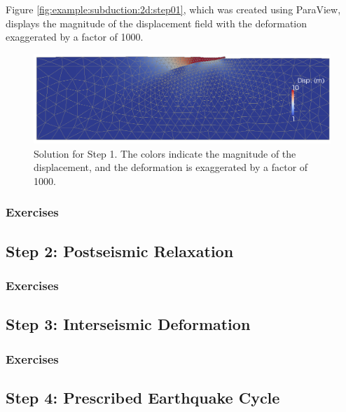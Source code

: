 Figure \vref{fig:example:subduction:2d:step01}, which was created using
ParaView, displays the magnitude of the displacement field with the
deformation exaggerated by a factor of 1000. 

\begin{figure}
  \includegraphics[width=4.5in]{examples/figs/subduction2d_step01_soln}
  \caption{Solution for Step 1. The colors indicate the magnitude of the displacement,
    and the deformation is exaggerated by a factor of 1000. }
  \label{fig:example:subduction:2d:step01}
\end{figure}


\subsubsection{Exercises}


\subsection{Step 2: Postseismic Relaxation}

\subsubsection{Exercises}


\subsection{Step 3: Interseismic Deformation}

\subsubsection{Exercises}

\subsection{Step 4: Prescribed Earthquake Cycle}

